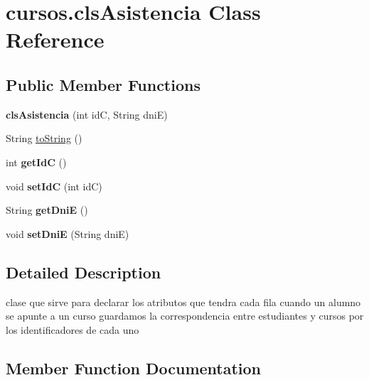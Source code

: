 \hypertarget{classcursos_1_1cls_asistencia}{}\section{cursos.\+cls\+Asistencia Class Reference}
\label{classcursos_1_1cls_asistencia}
\subsection*{Public Member Functions}
\begin{DoxyCompactItemize}
\item 
\mbox{\label{classcursos_1_1cls_asistencia_ae62fb27e3980e97b2ee70b263a80b5c7}} 
{\bfseries cls\+Asistencia} (int idC, String dniE)
\item 
String \hyperlink{classcursos_1_1cls_asistencia_ab513efc94b70e61f7507fbe9f173529e}{to\+String} ()
\item 
\mbox{\label{classcursos_1_1cls_asistencia_a32dc71346b337fae10192752fbf248a1}} 
int {\bfseries get\+IdC} ()
\item 
\mbox{\label{classcursos_1_1cls_asistencia_a971521cde0a74c2c70efca5994d0ab6b}} 
void {\bfseries set\+IdC} (int idC)
\item 
\mbox{\label{classcursos_1_1cls_asistencia_a2279eb6345a35dd566ee5021138e228f}} 
String {\bfseries get\+DniE} ()
\item 
\mbox{\label{classcursos_1_1cls_asistencia_ad3d3500b882dd61b3178f38bfd24a08e}} 
void {\bfseries set\+DniE} (String dniE)
\end{DoxyCompactItemize}


\subsection{Detailed Description}
clase que sirve para declarar los atributos que tendra cada fila cuando un alumno se apunte a un curso guardamos la correspondencia entre estudiantes y cursos por los identificadores de cada uno 

\subsection{Member Function Documentation}
\mbox{\label{classcursos_1_1cls_asistencia_ab513efc94b70e61f7507fbe9f173529e}} 
